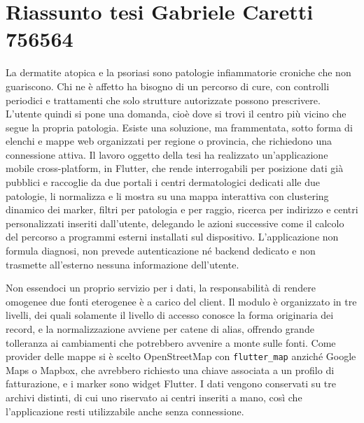 \documentclass[a4paper, oneside, openright]{book}
\begin{document}
\chapter*{Riassunto tesi Gabriele Caretti 756564}
\label{ch:riassunto}

La dermatite atopica e la psoriasi sono patologie infiammatorie croniche che non guariscono.
Chi ne è affetto ha bisogno di un percorso di cure, con controlli periodici e trattamenti che solo strutture autorizzate
possono prescrivere.
L'utente quindi si pone una domanda, cioè dove si trovi il centro più vicino che segue la propria
patologia.
Esiste una soluzione, ma frammentata, sotto forma di elenchi e mappe web organizzati per regione o provincia,
che richiedono una connessione attiva.
Il lavoro oggetto della tesi ha realizzato un'applicazione mobile cross-platform, in Flutter, che rende interrogabili per
posizione dati già pubblici e raccoglie da due portali i centri dermatologici dedicati alle due patologie,
li normalizza e li mostra su una mappa interattiva con clustering dinamico dei marker, filtri per patologia e per
raggio, ricerca per indirizzo e centri personalizzati inseriti dall'utente, delegando le azioni successive
come il calcolo del percorso a programmi esterni installati sul dispositivo.
L'applicazione non formula diagnosi, non prevede autenticazione né backend dedicato e non trasmette all'esterno nessuna
informazione dell'utente.

Non essendoci un proprio servizio per i dati, la responsabilità di rendere omogenee due fonti eterogenee è a carico del client.
Il modulo è organizzato in tre livelli, dei quali solamente il livello di accesso conosce la forma originaria dei record, e la
normalizzazione avviene per catene di alias, offrendo grande tolleranza ai cambiamenti che potrebbero avvenire a monte sulle fonti. %
Come provider delle mappe si è scelto OpenStreetMap con \texttt{flutter\_map} anziché Google Maps o Mapbox, che avrebbero
richiesto una chiave associata a un profilo di fatturazione, e i marker sono widget Flutter.
I dati vengono conservati su tre archivi distinti, di cui uno riservato ai centri inseriti a mano, %
così che l'applicazione resti utilizzabile anche senza connessione.
\end{document}
